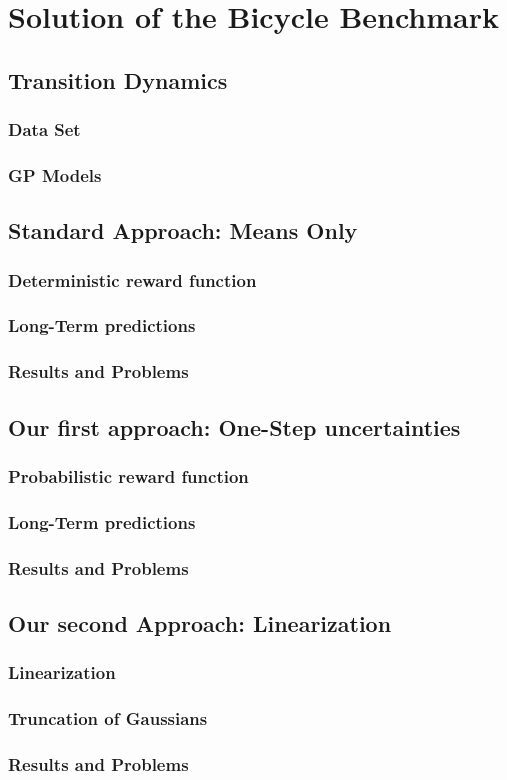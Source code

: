 \chapter{Solution of the Bicycle Benchmark}
\section{Transition Dynamics}
\subsection{Data Set}
\subsection{GP Models}
\section{Standard Approach: Means Only}
\subsection{Deterministic reward function}
\subsection{Long-Term predictions}
\subsection{Results and Problems}
\section{Our first approach: One-Step uncertainties}
\subsection{Probabilistic reward function}
\subsection{Long-Term predictions}
\subsection{Results and Problems}
\section{Our second Approach: Linearization}
\subsection{Linearization}
\subsection{Truncation of Gaussians}
\subsection{Results and Problems}
